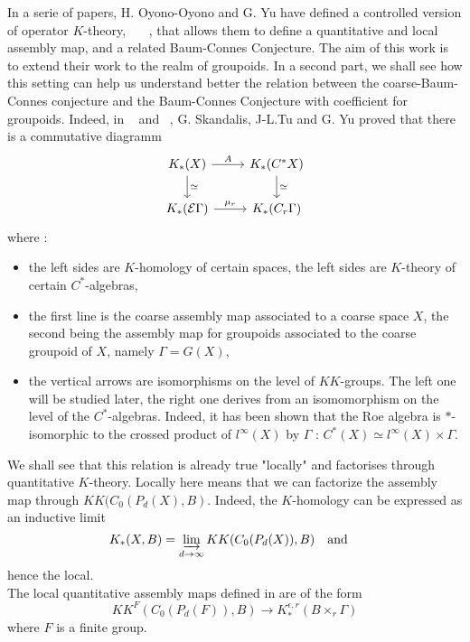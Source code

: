 In a serie of papers, H. Oyono-Oyono and G. Yu have defined a controlled version of operator $K$-theory, ~\cite{OY1}~\cite{OY2}~\cite{OY3}, that allows them to define a quantitative and local assembly map, and a related Baum-Connes Conjecture. The aim of this work is to extend their work to the realm of groupoids. In a second part, we shall see how this setting can help us understand better the relation between the coarse-Baum-Connes conjecture and the Baum-Connes Conjecture with coefficient for groupoids. Indeed, in ~\cite{TuBC} and ~\cite{SkTuYu}, G. Skandalis, J-L.Tu and G. Yu proved that there is a commutative diagramm
\[\begin{tikzcd}
K_*(X) \arrow{r}{A}\arrow{d}{\simeq} & K_*(C^*X)\arrow{d}{\simeq} \\
K_*(\mathcal E \Gamma)\arrow{r}{\mu_r} & K_*(C_r \Gamma)
\end{tikzcd}\]
where :
\begin{itemize}
\item the left sides are $K$-homology of certain spaces, the left sides are $K$-theory of certain $C^*$-algebras,
\item the first line is the coarse assembly map associated to a coarse space $X$, the second being the assembly map for groupoids associated to the coarse groupoid of $X$, namely $\Gamma = G(X)$,
\item the vertical arrows are isomorphisms on the level of $KK$-groups. The left one will be studied later, the right one derives from an isomomorphism on the level of the $C^*$-algebras. Indeed, it has been shown that the Roe algebra is $*$-isomorphic to the crossed product of $l^\infty (X)$ by $\Gamma$ : $C^*(X) \simeq l^\infty(X)\times \Gamma$.\\
\end{itemize}

We shall see that this relation is already true "locally" and factorises through quantitative $K$-theory. Locally here means that we can factorize the assembly map through $KK(C_0(P_d(X),B)$. Indeed, the $K$-homology can be expressed as an inductive limit 
\[K_*(X,B)=\varinjlim_{d\rightarrow \infty}  KK(C_0(P_d(X)), B ) \quad \text{and}\quad\] 
hence the local. \\

The local quantitative assembly maps defined in \cite{OY2} are of the form
\[KK^F(C_0(P_d(F)), B  ) \rightarrow K^{\epsilon, r}_*(B\times_r \Gamma)\]
where $F$ is a finite group. \\

